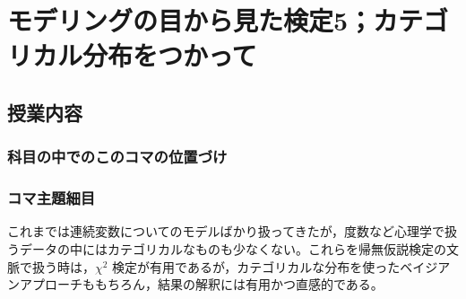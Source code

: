 \section{モデリングの目から見た検定5；カテゴリカル分布をつかって}
\subsection{授業内容}
\subsubsection{科目の中でのこのコマの位置づけ}
\subsubsection{コマ主題細目}
これまでは連続変数についてのモデルばかり扱ってきたが，度数など心理学で扱うデータの中にはカテゴリカルなものも少なくない。これらを帰無仮説検定の文脈で扱う時は，$\chi^2$ 検定が有用であるが，カテゴリカルな分布を使ったベイジアンアプローチももちろん，結果の解釈には有用かつ直感的である。

